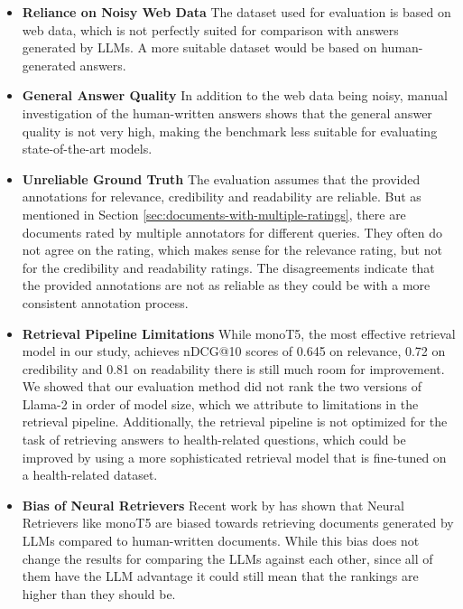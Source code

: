 \begin{itemize}
    \item 	\textbf{Reliance on Noisy Web Data} The dataset used for evaluation is based on web data, which is not perfectly suited for comparison with answers generated by LLMs. A more suitable dataset would be based on human-generated answers.

    \item 	\textbf{General Answer Quality} In addition to the web data being noisy, manual investigation of the human-written answers shows that the general answer quality is not very high, making the benchmark less suitable for evaluating state-of-the-art models.

    \item 	\textbf{Unreliable Ground Truth} The evaluation assumes that the provided annotations for relevance, credibility and readability are reliable. But as mentioned in Section \ref{sec:documents-with-multiple-ratings}, there are documents rated by multiple annotators for different queries. They often do not agree on the rating, which makes sense for the relevance rating, but not for the credibility and readability ratings. The disagreements indicate that the provided annotations are not as reliable as they could be with a more consistent annotation process.

    \item 	\textbf{Retrieval Pipeline Limitations} While monoT5, the most effective retrieval model in our study, achieves nDCG@10 scores of 0.645 on relevance, 0.72 on credibility and 0.81 on readability there is still much room for improvement. We showed that our evaluation method did not rank the two versions of Llama-2 in order of model size, which we attribute to limitations in the retrieval pipeline. Additionally, the retrieval pipeline is not optimized for the task of retrieving answers to health-related questions, which could be improved by using a more sophisticated retrieval model that is fine-tuned on a health-related dataset.

    \item   \textbf{Bias of Neural Retrievers} Recent work by \cite{dai:2023:llms} has shown that Neural Retrievers like monoT5 are biased towards retrieving documents generated by LLMs compared to human-written documents. While this bias does not change the results for comparing the LLMs against each other, since all of them have the LLM advantage it could still mean that the rankings are higher than they should be. 
\end{itemize}
